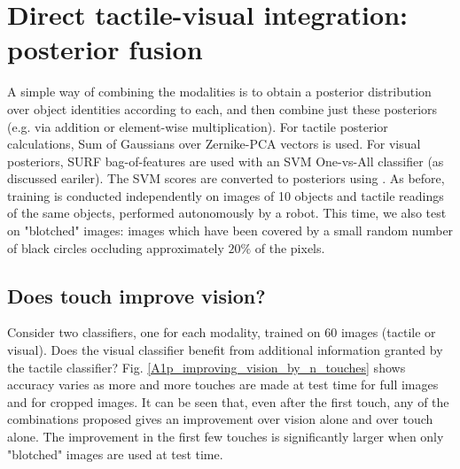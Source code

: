 \documentclass[]{article}
\begin{document}
 \begin{figure}
 	\centering
 	\end{figure}

\section{Direct tactile-visual integration: posterior fusion}
A simple way of combining the modalities is to obtain a posterior distribution over object identities according to each, and then combine just these posteriors (e.g. via addition or element-wise multiplication).
For tactile posterior calculations, Sum of Gaussians over Zernike-PCA vectors is used. For visual posteriors, SURF bag-of-features are used with an SVM One-vs-All classifier (as discussed eariler). The SVM scores are converted to posteriors using \cite{Platt1999}. As before, training is conducted independently on images of 10 objects and tactile readings of the same objects, performed autonomously by a robot. This time, we also test on "blotched" images: images which have been covered by a small random number of black circles occluding approximately $20\%$ of the pixels.
\subsection{Does touch improve vision?}
Consider two classifiers, one for each modality, trained on 60 images (tactile or visual). Does the visual classifier benefit from additional information granted by the tactile classifier? Fig. \ref{A1p_improving_vision_by_n_touches} shows accuracy varies as more and more touches are made at test time for full images and for cropped images. It can be seen that, even after the first touch, any of the combinations proposed gives an improvement over vision alone and over touch alone. The improvement in the first few touches is significantly larger when only "blotched" images are used at test time.
\begin{figure}
	\centering
	\end{figure}
\end{document}
